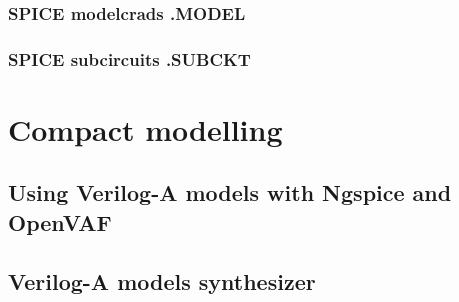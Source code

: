 \documentclass[a4paper,12pt]{article}
\begin{document}
\subsubsection{SPICE modelcrads .MODEL}

\subsubsection{SPICE subcircuits .SUBCKT}

\section{Compact modelling}

\subsection{Using Verilog-A models with Ngspice and OpenVAF}

\subsection{Verilog-A models synthesizer}
\end{document}
